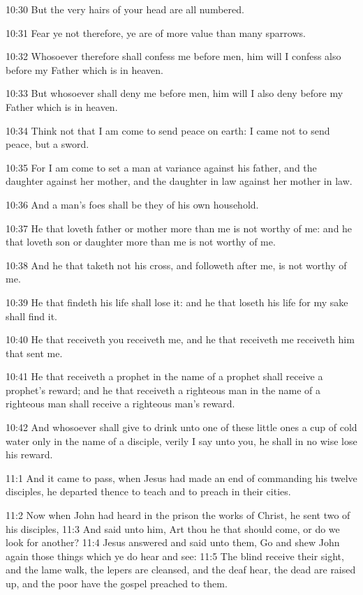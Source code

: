 10:30 But the very hairs of your head are all numbered.

10:31 Fear ye not therefore, ye are of more value than many sparrows.

10:32 Whosoever therefore shall confess me before men, him will I
confess also before my Father which is in heaven.

10:33 But whosoever shall deny me before men, him will I also deny
before my Father which is in heaven.

10:34 Think not that I am come to send peace on earth: I came not to
send peace, but a sword.

10:35 For I am come to set a man at variance against his father, and
the daughter against her mother, and the daughter in law against her
mother in law.

10:36 And a man's foes shall be they of his own household.

10:37 He that loveth father or mother more than me is not worthy of
me: and he that loveth son or daughter more than me is not worthy of
me.

10:38 And he that taketh not his cross, and followeth after me, is not
worthy of me.

10:39 He that findeth his life shall lose it: and he that loseth his
life for my sake shall find it.

10:40 He that receiveth you receiveth me, and he that receiveth me
receiveth him that sent me.

10:41 He that receiveth a prophet in the name of a prophet shall
receive a prophet's reward; and he that receiveth a righteous man in
the name of a righteous man shall receive a righteous man's reward.

10:42 And whosoever shall give to drink unto one of these little ones
a cup of cold water only in the name of a disciple, verily I say unto
you, he shall in no wise lose his reward.

11:1 And it came to pass, when Jesus had made an end of commanding his
twelve disciples, he departed thence to teach and to preach in their
cities.

11:2 Now when John had heard in the prison the works of Christ, he
sent two of his disciples, 11:3 And said unto him, Art thou he that
should come, or do we look for another?  11:4 Jesus answered and said
unto them, Go and shew John again those things which ye do hear and
see: 11:5 The blind receive their sight, and the lame walk, the lepers
are cleansed, and the deaf hear, the dead are raised up, and the poor
have the gospel preached to them.

